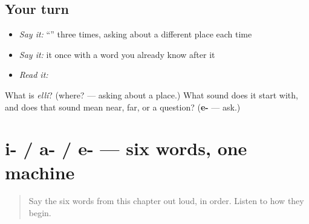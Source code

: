 \subsection*{Your turn}
\begin{itemize}
\raggedright
  \item \emph{Say it:} \textquotedblleft{}\textquotedblright{} three times, asking about a different place each time
  \item \emph{Say it:} it once with a word you already know after it
  \item \emph{Read it:} \textbf{}
\end{itemize}

\begin{tcolorbox}[breakable,colback=teal!4,colframe=teal!35!black,title={Before you move on}]
What is \emph{elli}? (where? — asking about a place.) What sound does it start with, and does that sound mean near, far, or a question? (\textbf{e-} — ask.)
\end{tcolorbox}
\section[i- / a- / e-]{i- / a- / e- — six words, one machine}

\label{lesson:KA-C41-deixis-system}



\begin{quote}
Say the six words from this chapter out loud, in order. Listen to how they begin.
\end{quote}

